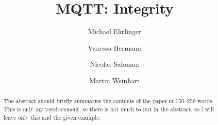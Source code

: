 \documentclass[runningheads]{llncs}
\begin{document}
%
\title{MQTT: Integrity}

\author{Michael Ehrlinger \and Vanessa Hermann \and Nicolas Salomon \and Martin Weinhart}



\maketitle

\begin{abstract}
The abstract should briefly summarize the contents of the paper in
150--250 words.
\newline
This is only my testdocument, so there is not much to put in the abstract, so i will leave only this and the given example.
\end{abstract}






\end{document}
